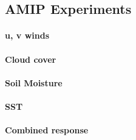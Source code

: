 \subsection{AMIP Experiments}

\paragraph{u, v winds}
\paragraph{Cloud cover}
\paragraph{Soil Moisture}
\paragraph{SST}
\paragraph{Combined response}


